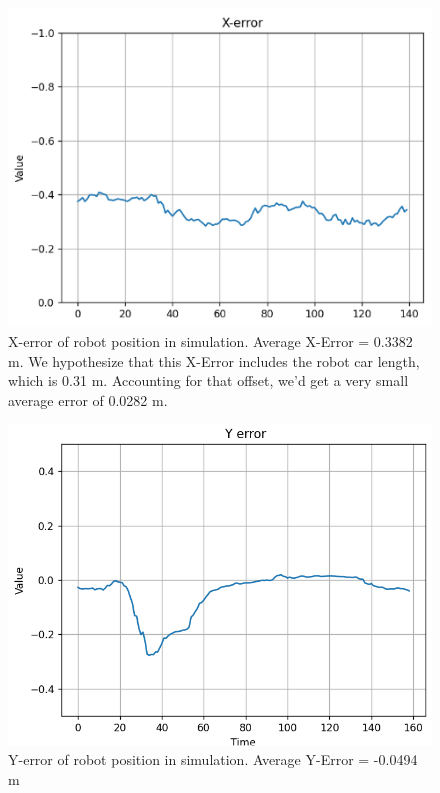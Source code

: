 \documentclass[11pt,twocolumn]{article}
\begin{document}
\begin{figure}[H]
    \centering
\includegraphics[scale=0.65]{figures/x_error.png}
    \caption{X-error of robot position in simulation. Average X-Error = 0.3382 m. We hypothesize that this X-Error includes the robot car length, which is 0.31 m. Accounting for that offset, we'd get a very small average error of 0.0282 m.}
    \label{fig:2}
\end{figure}

\begin{figure}[H]
    \centering
\includegraphics[scale=0.4]{figures/y_error.png}
    \caption{Y-error of robot position in simulation. Average Y-Error = -0.0494 m}
    \label{fig:3}
\end{figure}
\end{document}
